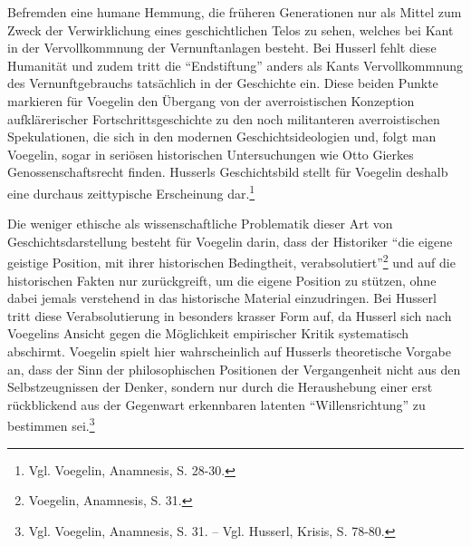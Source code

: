 Befremden eine humane Hemmung, die früheren Generationen nur als Mittel zum
Zweck der Verwirklichung eines geschichtlichen Telos zu sehen, welches bei
Kant in der Vervollkommnung der Vernunftanlagen besteht. Bei Husserl fehlt
diese Humanität und zudem tritt die "`Endstiftung"' anders als Kants
Vervollkommnung des Vernunftgebrauchs tatsächlich in der Geschichte ein.
Diese beiden Punkte markieren für Voegelin den Übergang von der
averroistischen Konzeption aufklärerischer Fortschrittsgeschichte zu den noch
militanteren averroistischen Spekulationen, die sich in den modernen
Geschichtsideologien und, folgt man Voegelin, sogar in seriösen historischen
Untersuchungen wie Otto Gierkes Genossenschaftsrecht finden.  Husserls
Geschichtsbild stellt für Voegelin deshalb eine durchaus zeittypische
Erscheinung dar.\footnote{Vgl.  Voegelin, Anamnesis, S. 28-30.}

Die weniger ethische als wissenschaftliche Problematik dieser Art von
Geschichtsdarstellung besteht für Voegelin darin, dass der Historiker "`die
eigene geistige Position, mit ihrer historischen Bedingtheit,
verabsolutiert"'\footnote{Voegelin, Anamnesis, S. 31.}  und auf die
historischen Fakten nur zurückgreift, um die eigene Position zu stützen, ohne
dabei jemals verstehend in das historische Material einzudringen. Bei Husserl
tritt diese Verabsolutierung in besonders krasser Form auf, da Husserl sich
nach Voegelins Ansicht gegen die Möglichkeit empirischer Kritik systematisch
abschirmt. Voegelin spielt hier wahrscheinlich auf Husserls theoretische
Vorgabe an, dass der Sinn der philosophischen Positionen der Vergangenheit
nicht aus den Selbstzeugnissen der Denker, sondern nur durch die Heraushebung
einer erst rückblickend aus der Gegenwart erkennbaren latenten
"`Willensrichtung"' zu bestimmen sei.\footnote{Vgl.  Voegelin, Anamnesis,
  S. 31. -- Vgl. Husserl, Krisis, S. 78-80.}

